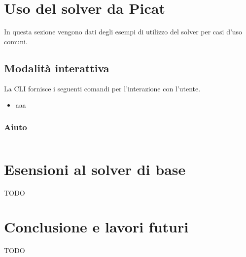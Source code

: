 \documentclass[12pt,a4paper,openright]{book} %
\begin{document}
\chapter{Uso del solver \lset{} da Picat}

In questa sezione vengono dati degli esempi di utilizzo del solver per casi d'uso comuni.

\section{Modalità interattiva}

La CLI fornisce i seguenti comandi per l'interazione con l'utente.
\begin{itemize}
\item aaa
\end{itemize}

\subsection{Aiuto}
\begin{verbatim}

\end{verbatim}


\chapter{Esensioni al solver di base}
TODO

\chapter{Conclusione e lavori futuri}
TODO
\end{document}
